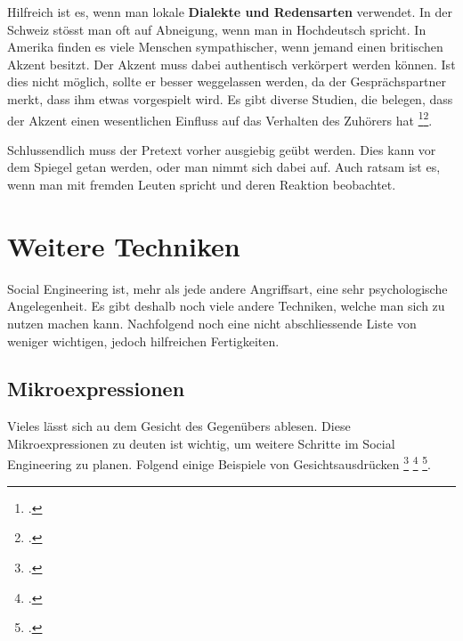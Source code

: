 Hilfreich ist es, wenn man lokale \textbf{Dialekte und Redensarten} verwendet. In der Schweiz stösst man oft auf Abneigung, wenn man in Hochdeutsch spricht. In Amerika finden es viele Menschen sympathischer, wenn jemand einen britischen Akzent besitzt. Der Akzent muss dabei authentisch verkörpert werden können. Ist dies nicht möglich, sollte er besser weggelassen werden, da der Gesprächspartner merkt, dass ihm etwas vorgespielt wird. Es gibt diverse Studien, die belegen, dass der Akzent einen wesentlichen Einfluss auf das Verhalten des Zuhörers hat \footcite{Journal_of_Targeting_Measurement_and_Analysis_for_Marketing_2015-05-14}\footcite{The_Effect_of_Perceived_Regional_Accents_on_Individual_Economic_Behavior_2015-05-14}.

Schlussendlich muss der Pretext vorher ausgiebig geübt werden. Dies kann vor dem Spiegel getan werden, oder man nimmt sich dabei auf. Auch ratsam ist es, wenn man mit fremden Leuten spricht und deren Reaktion beobachtet.

\section{Weitere Techniken}
Social Engineering ist, mehr als jede andere Angriffsart, eine sehr psychologische Angelegenheit. Es gibt deshalb noch viele andere Techniken, welche man sich zu nutzen machen kann. Nachfolgend noch eine nicht abschliessende Liste von weniger wichtigen, jedoch hilfreichen Fertigkeiten.

\subsection{Mikroexpressionen}
Vieles lässt sich au dem Gesicht des Gegenübers ablesen. Diese Mikroexpressionen zu deuten ist wichtig, um weitere Schritte im Social Engineering zu planen.
Folgend einige Beispiele von Gesichtsausdrücken
\footcite{Anger_by_kwerfeldein_on_DeviantArt_2015-05-16}
\footcite{Ekman_-_Facial_Expressions_Foreign_Language_Flashcards_-_Cramcom_2015-05-16}
\footcite{Facial_expression_project_-_laughing_girls__Flickr_-_Photo_Sharing_2015-05-16}.

